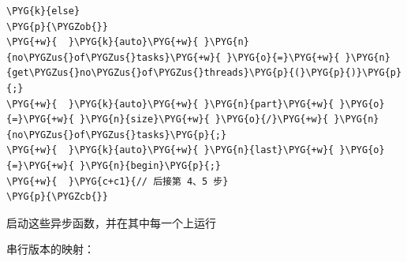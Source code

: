 \begin{codeblockbg}
\begin{Verbatim}[commandchars=\\\{\},breaklines=true,breakanywhere=true,fontsize=\codefont,xleftmargin=17bp]
\PYG{k}{else}
\PYG{p}{\PYGZob{}}
\PYG{+w}{  }\PYG{k}{auto}\PYG{+w}{ }\PYG{n}{no\PYGZus{}of\PYGZus{}tasks}\PYG{+w}{ }\PYG{o}{=}\PYG{+w}{ }\PYG{n}{get\PYGZus{}no\PYGZus{}of\PYGZus{}threads}\PYG{p}{(}\PYG{p}{)}\PYG{p}{;}
\PYG{+w}{  }\PYG{k}{auto}\PYG{+w}{ }\PYG{n}{part}\PYG{+w}{ }\PYG{o}{=}\PYG{+w}{ }\PYG{n}{size}\PYG{+w}{ }\PYG{o}{/}\PYG{+w}{ }\PYG{n}{no\PYGZus{}of\PYGZus{}tasks}\PYG{p}{;}
\PYG{+w}{  }\PYG{k}{auto}\PYG{+w}{ }\PYG{n}{last}\PYG{+w}{ }\PYG{o}{=}\PYG{+w}{ }\PYG{n}{begin}\PYG{p}{;}
\PYG{+w}{  }\PYG{c+c1}{// 后接第 4、5 步}
\PYG{p}{\PYGZcb{}}
\end{Verbatim}
\end{codeblockbg}



启动这些异步函数，并在其中每一个上运行



串行版本的映射：




